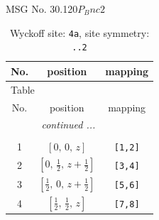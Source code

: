\documentclass[fleqn,8pt]{jsarticle}
\begin{document}
\setcounter{MaxMatrixCols}{32}

\renewcommand{\tablename}{Table~}
\renewcommand{\figurename}{Figure~}
\begin{center}
\LARGE
MSG No. 30.120\quad$P_{B}nc2$
\end{center}
\renewcommand{\arraystretch}{1.2}
\begin{longtable}{ccc}
\caption{Wyckoff site: {\tt 4a}, site symmetry: {\tt ..2}}
 \\
 \hline \hline
No. & position & mapping \\ \hline \endfirsthead

\multicolumn{2}{l}{\tablename\ \thetable{}} \\
 \hline \hline
No. & position & mapping \\ \hline \endhead

 \hline \hline
\multicolumn{2}{r}{\footnotesize\it continued ...} \\ \endfoot

 \hline \hline
\multicolumn{2}{r}{} \\ \endlastfoot

1 & $\left[ 0,\, 0,\, z \right]$ & {\tt [1,2]} \\ \hline
2 & $\left[ 0,\, \frac{1}{2},\, z + \frac{1}{2} \right]$ & {\tt [3,4]} \\ \hline
3 & $\left[ \frac{1}{2},\, 0,\, z + \frac{1}{2} \right]$ & {\tt [5,6]} \\ \hline
4 & $\left[ \frac{1}{2},\, \frac{1}{2},\, z \right]$ & {\tt [7,8]} \\
\end{longtable}
\renewcommand{\arraystretch}{1.2}
\end{document}

